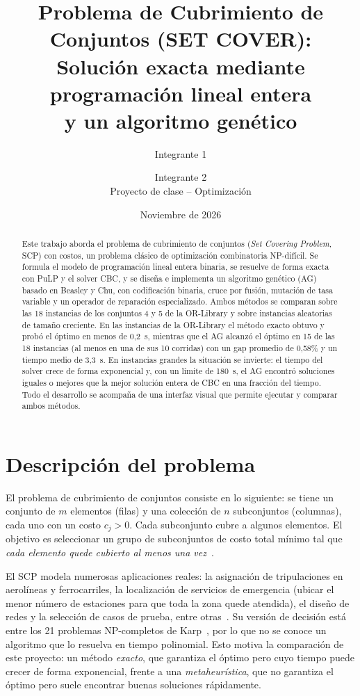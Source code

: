 \documentclass[11pt,a4paper]{article}
\title{\textbf{Problema de Cubrimiento de Conjuntos (SET COVER):\\
Solución exacta mediante programación lineal entera\\
y un algoritmo genético}}
\author{Integrante 1 \and Integrante 2\\[2pt]
\small Proyecto de clase -- Optimización}
\date{Noviembre de 2026}
\begin{document}
\maketitle

\begin{abstract}
Este trabajo aborda el problema de cubrimiento de conjuntos (\emph{Set Covering Problem}, SCP) con costos,
un problema clásico de optimización combinatoria NP-difícil. Se formula el modelo de programación lineal
entera binaria, se resuelve de forma exacta con PuLP y el solver CBC, y se diseña e implementa un
algoritmo genético (AG) basado en Beasley y Chu, con codificación binaria, cruce por fusión, mutación de
tasa variable y un operador de reparación especializado. Ambos métodos se comparan sobre las 18
instancias de los conjuntos 4 y 5 de la OR-Library y sobre instancias aleatorias de tamaño creciente. En
las instancias de la OR-Library el método exacto obtuvo y probó el óptimo en menos de 0,2~s, mientras que
el AG alcanzó el óptimo en 15 de las 18 instancias (al menos en una de sus 10 corridas) con un gap
promedio de 0,58\% y un tiempo medio de 3,3~s. En instancias grandes la situación se invierte: el
tiempo del solver crece de forma exponencial y, con un límite de 180~s, el AG encontró soluciones iguales
o mejores que la mejor solución entera de CBC en una fracción del tiempo. Todo el desarrollo se acompaña
de una interfaz visual que permite ejecutar y comparar ambos métodos.
\end{abstract}

\section{Descripción del problema}
El problema de cubrimiento de conjuntos consiste en lo siguiente: se tiene un conjunto de
$m$ elementos (filas) y una colección de $n$ subconjuntos (columnas), cada uno con un costo
$c_j>0$. Cada subconjunto cubre a algunos elementos. El objetivo es seleccionar un grupo de
subconjuntos de costo total mínimo tal que \emph{cada elemento quede cubierto al menos una
vez}~\citep{caprara2000,beasley1996ga}.

El SCP modela numerosas aplicaciones reales: la asignación de tripulaciones en aerolíneas y
ferrocarriles, la localización de servicios de emergencia (ubicar el menor número de
estaciones para que toda la zona quede atendida), el diseño de redes y la selección de casos de
prueba, entre otras~\citep{caprara2000}. Su versión de decisión está entre los 21 problemas
NP-completos de Karp~\citep{karp1972,garey1979}, por lo que no se conoce un algoritmo que lo
resuelva en tiempo polinomial. Esto motiva la comparación de este proyecto: un método
\emph{exacto}, que garantiza el óptimo pero cuyo tiempo puede crecer de forma exponencial, frente a
una \emph{metaheurística}, que no garantiza el óptimo pero suele encontrar buenas soluciones
rápidamente.
\end{document}
